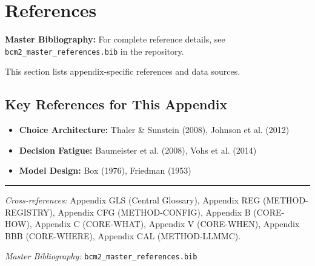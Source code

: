 \section{References}
\label{sec:eee-references}

\begin{tcolorbox}[colback=blue!5!white, colframe=blue!75!black]
\textbf{Master Bibliography:} For complete reference details, see
\texttt{bcm2\_master\_references.bib} in the repository.

This section lists appendix-specific references and data sources.
\end{tcolorbox}

\vspace{0.5em}

\subsection{Key References for This Appendix}

\begin{itemize}[nosep]
    \item \textbf{Choice Architecture:} Thaler \& Sunstein (2008), Johnson et al. (2012)
    \item \textbf{Decision Fatigue:} Baumeister et al. (2008), Vohs et al. (2014)
    \item \textbf{Model Design:} Box (1976), Friedman (1953)
\end{itemize}

\nocite{bcm_master}



\vspace{1em}
\hrule
\vspace{0.5em}

\noindent\textit{Cross-references:}
Appendix GLS (Central Glossary),
Appendix REG (METHOD-REGISTRY),
Appendix CFG (METHOD-CONFIG),
Appendix B (CORE-HOW),
Appendix C (CORE-WHAT),
Appendix V (CORE-WHEN),
Appendix BBB (CORE-WHERE),
Appendix CAL (METHOD-LLMMC).

\noindent\textit{Master Bibliography:} \texttt{bcm2\_master\_references.bib}


